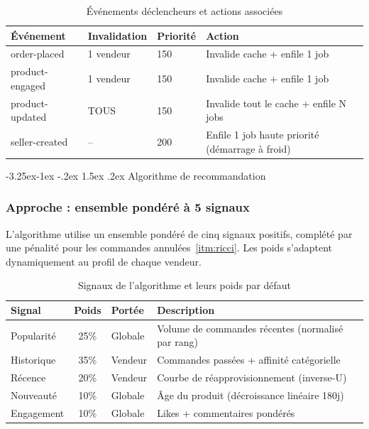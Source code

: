 \documentclass[12pt,a4paper,openany]{report}
\makeatletter
\renewcommand\subsection{\@startsection{subsection}{2}{\z@}%
  {-3.25ex\@plus -1ex \@minus -.2ex}%
  {1.5ex \@plus .2ex}%
  {\needspace{8\baselineskip}\normalfont\large\bfseries\color{primary!80!black}}}
\makeatother
\begin{document}
\begin{table}[H]
\centering
{}
\begin{tabularx}{\textwidth}{lllX}
\toprule
\rowcolor{headerblue!20}
\textbf{Événement} & \textbf{Invalidation} & \textbf{Priorité} & \textbf{Action} \\
\midrule
order-placed & 1 vendeur & 150 & Invalide cache + enfile 1 job \\
product-engaged & 1 vendeur & 150 & Invalide cache + enfile 1 job \\
product-updated & TOUS & 150 & Invalide tout le cache + enfile N jobs \\
seller-created & -- & 200 & Enfile 1 job haute priorité (démarrage à froid) \\
\bottomrule
\end{tabularx}
\caption{Événements déclencheurs et actions associées}
\end{table}

\subsection{Algorithme de recommandation}

\subsubsection{Approche : ensemble pondéré à 5 signaux}

L'algorithme utilise un ensemble pondéré de cinq signaux positifs, complété par une pénalité pour les commandes annulées~\ref{itm:ricci}. Les poids s'adaptent dynamiquement au profil de chaque vendeur.

\begin{table}[H]
\centering
{}
\begin{tabular}{lclp{6.5cm}}
\toprule
\rowcolor{headerblue!20}
\textbf{Signal} & \textbf{Poids} & \textbf{Portée} & \textbf{Description} \\
\midrule
Popularité  & 25\% & Globale  & Volume de commandes récentes (normalisé par rang) \\
Historique  & 35\% & Vendeur  & Commandes passées + affinité catégorielle \\
Récence     & 20\% & Vendeur  & Courbe de réapprovisionnement (inverse-U) \\
Nouveauté   & 10\% & Globale  & Âge du produit (décroissance linéaire 180j) \\
Engagement  & 10\% & Globale  & Likes + commentaires pondérés \\
\bottomrule
\end{tabular}
\caption{Signaux de l'algorithme et leurs poids par défaut}
\end{table}
\end{document}
